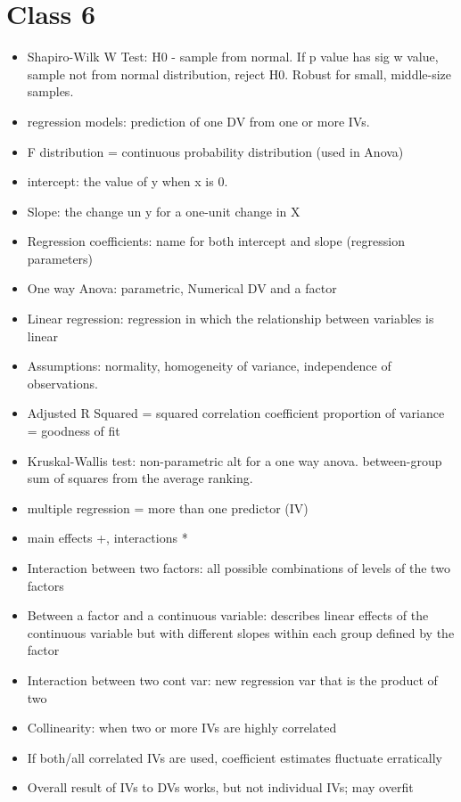 \documentclass[11pt]{article}
\newenvironment{itemise}{
\begin{itemize}
  \setlength{\itemsep}{1pt}
  \setlength{\parskip}{0pt}
  \setlength{\parsep}{0pt}
}{\end{itemize}}
\begin{document}
\section*{Class 6}
\begin{itemise}
\item Shapiro-Wilk W Test: H0 - sample from normal. If p value has sig w value, sample not from normal distribution, reject H0. Robust for small, middle-size samples. 
\item regression models: prediction of one DV from one or more IVs.
\item F distribution = continuous probability distribution (used in Anova)
\item intercept: the value of y when x is 0. 
\item Slope: the change un y for a one-unit change in X
\item Regression coefficients: name for both intercept and slope (regression parameters)
\item One way Anova: parametric, Numerical DV and a factor
\item Linear regression: regression in which the relationship between variables is linear
\item Assumptions: normality, homogeneity of variance, independence of observations.
\item Adjusted R Squared = squared correlation coefficient proportion of variance = goodness of fit
\item Kruskal-Wallis test: non-parametric alt for a one way anova. between-group sum of squares from the average ranking. 
\item multiple regression = more than one predictor (IV)
\item main effects +, interactions *
\item Interaction between two factors: all possible combinations of levels of the two factors
\item Between a factor and a continuous variable: describes linear effects of the continuous variable but with different slopes within each group defined by the factor
\item Interaction between two cont var: new regression var that is the product of two
\item Collinearity: when two or more IVs are highly correlated
\item If both/all correlated IVs are used, coefficient estimates fluctuate erratically
\item Overall result of IVs to DVs works, but not individual IVs; may overfit
\end{itemise}
\end{document}
